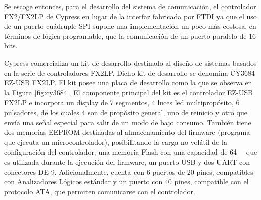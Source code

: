 Se escoge entonces, para el desarrollo del sistema de comunicación, el controlador FX2/FX2LP de Cypress en lugar de la interfaz fabricada por FTDI ya que el uso de un puerto cuádruple SPI supone una implementación un poco más costosa, en términos de lógica programable, que la comunicación de un puerto paralelo de 16 bits.

Cypress comercializa un kit de desarrollo destinado al diseño de sistemas basados en la serie de controladores FX2LP. Dicho kit de desarrollo se denomina CY3684 EZ-USB FX2LP. El kit posee una placa de desarrollo como la que se observa en la Figura \ref{fig:cy3684}. El componente principal del kit es el controlador EZ-USB FX2LP e incorpora un display de 7 segmentos, 4 luces led multipropósito, 6 pulsadores, de los cuales 4 son de propósito general, uno de reinicio y otro que envía una señal especial para salir de un modo de bajo consumo. También tiene dos memorias EEPROM destinadas al almacenamiento del firmware (programa que ejecuta un microcontrolador), posibilitando la carga no volátil de la configuración del controlador; una memoria Flash con una capacidad de \SI{64}{\kilo\byte} que es utilizada durante la ejecución del firmware, un puerto USB y dos UART con conectores DE-9. Adicionalmente, cuenta con 6 puertos de 20 pines, compatibles con Analizadores Lógicos estándar y un puerto con 40 pines, compatible con el protocolo ATA, que permiten comunicarse con el controlador.
 

